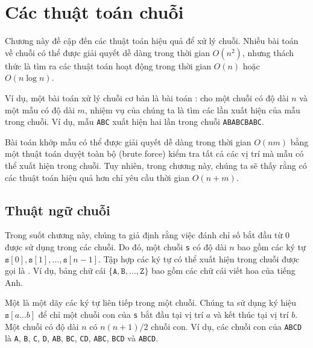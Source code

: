 \chapter{Các thuật toán chuỗi}

Chương này đề cập đến các thuật toán hiệu quả
để xử lý chuỗi.
Nhiều bài toán về chuỗi có thể được giải quyết dễ dàng
trong thời gian $O(n^2)$, nhưng thách thức là
tìm ra các thuật toán hoạt động trong thời gian $O(n)$ hoặc $O(n \log n)$.


Ví dụ, một bài toán xử lý chuỗi cơ bản
là bài toán :
cho một chuỗi có độ dài $n$ và một mẫu có độ dài $m$,
nhiệm vụ của chúng ta là tìm các lần xuất hiện của mẫu
trong chuỗi.
Ví dụ, mẫu \texttt{ABC} xuất hiện hai
lần trong chuỗi \texttt{ABABCBABC}.

Bài toán khớp mẫu có thể được giải quyết dễ dàng
trong thời gian $O(nm)$ bằng một thuật toán duyệt toàn bộ (brute force)
kiểm tra tất cả các vị trí mà mẫu có thể
xuất hiện trong chuỗi.
Tuy nhiên, trong chương này, chúng ta sẽ thấy rằng có
các thuật toán hiệu quả hơn chỉ yêu cầu
thời gian $O(n+m)$.


\section{Thuật ngữ chuỗi}


Trong suốt chương này, chúng ta giả định rằng
việc đánh chỉ số bắt đầu từ 0 được sử dụng trong các chuỗi.
Do đó, một chuỗi \texttt{s} có độ dài $n$
bao gồm các ký tự
$\texttt{s}[0],\texttt{s}[1],\ldots,\texttt{s}[n-1]$.
Tập hợp các ký tự có thể xuất hiện
trong chuỗi được gọi là .
Ví dụ, bảng chữ cái
$\{\texttt{A},\texttt{B},\ldots,\texttt{Z}\}$
bao gồm các chữ cái viết hoa của tiếng Anh.


Một  là một dãy các ký tự
liên tiếp trong một chuỗi.
Chúng ta sử dụng ký hiệu $\texttt{s}[a \ldots b]$
để chỉ một chuỗi con của \texttt{s}
bắt đầu tại vị trí $a$ và kết thúc tại vị trí $b$.
Một chuỗi có độ dài $n$ có $n(n+1)/2$ chuỗi con.
Ví dụ, các chuỗi con của
\texttt{ABCD} là
\texttt{A}, \texttt{B}, \texttt{C}, \texttt{D},
\texttt{AB}, \texttt{BC}, \texttt{CD},
\texttt{ABC}, \texttt{BCD} và \texttt{ABCD}.


